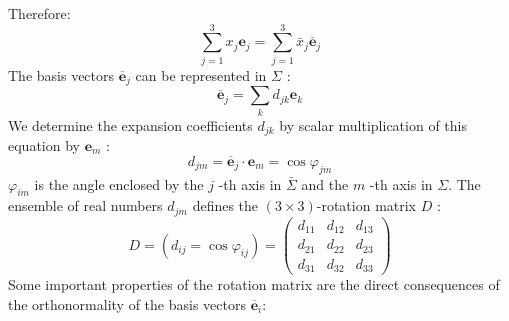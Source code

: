 \documentclass[12pt]{book}
\theoremstyle{definition}\newtheorem{dfn}{Définition}[chapter]
\theoremstyle{plain}\newtheorem{thm}{Théorème}[chapter]
\theoremstyle{plain}\newtheorem{prp}{Proposition}[chapter]
\theoremstyle{plain}\newtheorem{lem}{\bf Lemme}[chapter]
\theoremstyle{plain}\newtheorem{axm}{\bf Axiome}[chapter]
\theoremstyle{plain}\newtheorem{lmm}{\bf Lemme}[chapter]
\theoremstyle{plain}\newtheorem{cor}{\bf Corollaire}[chapter]
\theoremstyle{remark}\newtheorem{rem}{Remarque}[chapter]
\begin{document}
Therefore:
\begin{equation}
\sum_{j=1}^{3} x_{j} \mathbf{e}_{j}=\sum_{j=1}^{3} \bar{x}_{j} \overline{\mathbf{e}}_{j}\label{1}
\end{equation}
The basis vectors $\overline{\mathbf{e}}_{j}$ can be represented in $\Sigma$ :
$$
\overline{\mathbf{e}}_{j}=\sum_{k} d_{j k} \mathbf{e}_{k}
$$
We determine the expansion coefficients $d_{j k}$ by scalar multiplication of this equation by $\mathbf{e}_{m}$ :
$$
d_{j m}=\overline{\mathbf{e}}_{j} \cdot \mathbf{e}_{m}=\cos \varphi_{j m}
$$
$\varphi_{i m}$ is the angle enclosed by the $j$ -th axis in $\bar{\Sigma}$ and the $m$ -th axis in $\Sigma$. The ensemble of real numbers $d_{j m}$ defines the $(3 \times 3)$-rotation matrix $D$ :
$$
D=\left(d_{i j}=\cos \varphi_{i j}\right)=\left(\begin{array}{lll}
d_{11} & d_{12} & d_{13} \\
d_{21} & d_{22} & d_{23} \\
d_{31} & d_{32} & d_{33}
\end{array}\right)
$$
Some important properties of the rotation matrix are the direct consequences of the orthonormality of the basis vectors $\overline{\mathbf{e}}_{i}$:
\end{document}
